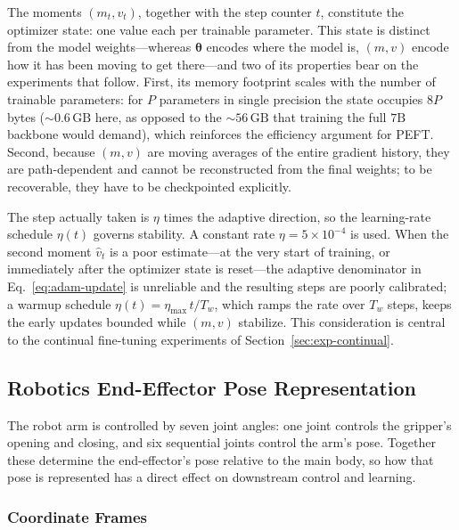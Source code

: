 \documentclass[english,12pt,a4paper,pdftex,elec,utf8]{aaltothesis}
\newcommand{\vhat}{\hat{v}}
\begin{document}
The moments $(m_t, v_t)$, together with the step counter $t$, constitute the optimizer state: one value each per trainable parameter. This state is distinct from the model weights---whereas $\boldsymbol{\theta}$ encodes where the model is, $(m,v)$ encode how it has been moving to get there---and two of its properties bear on the experiments that follow. First, its memory footprint scales with the number of trainable parameters: for $P$ parameters in single precision the state occupies $8P$ bytes ($\sim\!0.6\,\text{GB}$ here, as opposed to the $\sim\!56\,\text{GB}$ that training the full $7\text{B}$ backbone would demand), which reinforces the efficiency argument for PEFT. Second, because $(m,v)$ are moving averages of the entire gradient history, they are path-dependent and cannot be reconstructed from the final weights; to be recoverable, they have to be checkpointed explicitly.

The step actually taken is $\eta$ times the adaptive direction, so the learning-rate schedule $\eta(t)$ governs stability. A constant rate $\eta = 5\times 10^{-4}$ is used. When the second moment $\vhat_t$ is a poor estimate---at the very start of training, or immediately after the optimizer state is reset---the adaptive denominator in Eq.~\eqref{eq:adam-update} is unreliable and the resulting steps are poorly calibrated; a warmup schedule $\eta(t) = \eta_{\max}\, t / T_w$, which ramps the rate over $T_w$ steps, keeps the early updates bounded while $(m,v)$ stabilize. This consideration is central to the continual fine-tuning experiments of Section~\ref{sec:exp-continual}.

\subsection{Robotics End-Effector Pose Representation}
\label{sec:pose-representation}
The robot arm is controlled by seven joint angles: one joint controls the gripper's opening and closing, and six sequential joints control the arm's pose. Together these determine the end-effector's pose relative to the main body, so how that pose is represented has a direct effect on downstream control and learning.

\subsubsection{Coordinate Frames}
\end{document}
